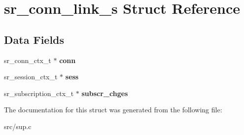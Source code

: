 \hypertarget{structsr__conn__link__s}{}\section{sr\+\_\+conn\+\_\+link\+\_\+s Struct Reference}
\label{structsr__conn__link__s}
\subsection*{Data Fields}
\begin{DoxyCompactItemize}
\item 
\mbox{\label{structsr__conn__link__s_ac736380e25a7b992d090ba9afc6757bb}} 
sr\+\_\+conn\+\_\+ctx\+\_\+t $\ast$ {\bfseries conn}
\item 
\mbox{\label{structsr__conn__link__s_a9813a97dadca96e996357a308b5c7874}} 
sr\+\_\+session\+\_\+ctx\+\_\+t $\ast$ {\bfseries sess}
\item 
\mbox{\label{structsr__conn__link__s_ab6ad04147f4a2ab1e45e5580d8fe0cae}} 
sr\+\_\+subscription\+\_\+ctx\+\_\+t $\ast$ {\bfseries subscr_chges}
\end{DoxyCompactItemize}


The documentation for this struct was generated from the following file\+:\begin{DoxyCompactItemize}
\item 
src/sup.\+c\end{DoxyCompactItemize}
